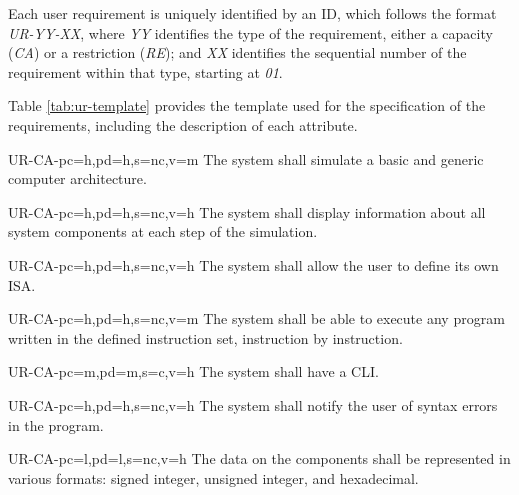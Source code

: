 Each user requirement is uniquely identified by an ID, which follows the format \textit{UR-YY-XX}, where \textit{YY} identifies the type of the requirement, either a capacity (\textit{CA}) or a restriction (\textit{RE}); and \textit{XX} identifies the sequential number of the requirement within that type, starting at \textit{01}.

Table \ref{tab:ur-template} provides the template used for the specification of the requirements, including the description of each attribute.




\setcounter{i}{1}

\begin{userReq}{UR-CA-}{pc=h,pd=h,s=nc,v=m}
  The system shall simulate a basic and generic computer architecture.
\end{userReq}

\begin{userReq}{UR-CA-}{pc=h,pd=h,s=nc,v=h}
  The system shall display information about all system components at each step of the simulation.
\end{userReq}

\begin{userReq}{UR-CA-}{pc=h,pd=h,s=nc,v=h}
  The system shall allow the user to define its own \gls{ISA}.
\end{userReq}

\begin{userReq}{UR-CA-}{pc=h,pd=h,s=nc,v=m}
  The system shall be able to execute any program written in the defined instruction set, instruction by instruction.
\end{userReq}

\begin{userReq}{UR-CA-}{pc=m,pd=m,s=c,v=h}
  The system shall have a \gls{CLI}.
\end{userReq}

\begin{userReq}{UR-CA-}{pc=h,pd=h,s=nc,v=h}
  The system shall notify the user of syntax errors in the program.
\end{userReq}

\begin{userReq}{UR-CA-}{pc=l,pd=l,s=nc,v=h}
  The data on the components shall be represented in various formats: signed integer, unsigned integer, and hexadecimal.
\end{userReq}

